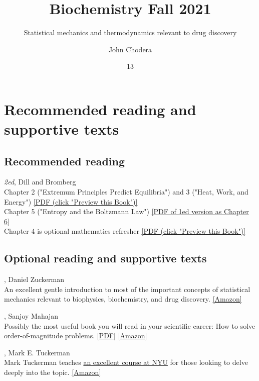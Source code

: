 \documentclass[english,course]{lecture}
\title{Biochemistry Fall 2021}
\subtitle{Statistical mechanics and thermodynamics relevant to drug discovery}
\author{John Chodera}
\date{13}{09}{2021}
\begin{document}
\vfill
\eject


\section{Recommended reading and supportive texts}

\subsection*{Recommended reading}

 \emph{2ed}, Dill and Bromberg\\
Chapter 2 ("Extremum Principles Predict Equilibria") and 3 ("Heat, Work, and Energy") \href{https://tinyurl.com/dill-bromberg-preview}{[PDF (click "Preview this Book")]}\\
Chapter 5 ("Entropy and the Boltzmann Law") \href{https://tinyurl.com/dill-bromberg-boltzmann}{[PDF of 1ed version as Chapter 6]}\\
Chapter 4 is optional mathematics refresher \href{https://tinyurl.com/dill-bromberg-preview}{[PDF (click "Preview this Book")]}

\subsection*{Optional reading and supportive texts}

, Daniel Zuckerman \\
An excellent gentle introduction to most of the important concepts of statistical mechanics relevant to biophysics, biochemistry, and drug discovery. 
\href{https://www.amazon.com/dp/B005H6YEBI}{[Amazon]} 

, Sanjoy Mahajan \\
Possibly the most useful book you will read in your scientific career: How to solve order-of-magnitude problems.
\href{https://tinyurl.com/street-fighting-mathematics}{[PDF]}
\href{https://www.amazon.com/exec/obidos/ASIN/026251429X}{[Amazon]}

, Mark E. Tuckerman \\
Mark Tuckerman teaches \href{http://www.nyu.edu/classes/tuckerman/stat.mech/}{an excellent course at NYU} for those looking to delve deeply into the topic.
\href{https://www.amazon.com/Statistical-Mechanics-Molecular-Simulation-Graduate/dp/0198525265}{[Amazon]}
\end{document}
